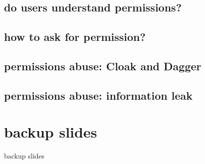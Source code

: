\subsection{do users understand permissions?}


\subsection{how to ask for permission?}


\subsection{permissions abuse: Cloak and Dagger}


\subsection{permissions abuse: information leak}






\section{backup slides}
\begin{frame}{backup slides}
\end{frame}
